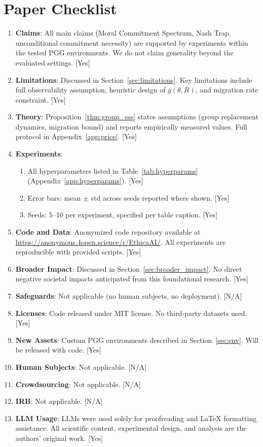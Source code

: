 \documentclass{article}
\begin{document}
\section*{Paper Checklist}

\begin{enumerate}
\item \textbf{Claims}: All main claims (Moral Commitment Spectrum, Nash Trap, unconditional commitment necessity) are supported by experiments within the tested PGG environments. We do not claim generality beyond the evaluated settings. [Yes]
\item \textbf{Limitations}: Discussed in Section~\ref{sec:limitations}. Key limitations include full observability assumption, heuristic design of $g(\theta, R)$, and migration rate constraint. [Yes]
\item \textbf{Theory}: Proposition~\ref{thm:group_ess} states assumptions (group replacement dynamics, migration bound) and reports empirically measured values. Full protocol in Appendix~\ref{app:price}. [Yes]
\item \textbf{Experiments}:
  \begin{enumerate}
    \item All hyperparameters listed in Table~\ref{tab:hyperparams} (Appendix~\ref{app:hyperparams}). [Yes]
    \item Error bars: mean $\pm$ std across seeds reported where shown. [Yes]
    \item Seeds: 5--10 per experiment, specified per table caption. [Yes]
  \end{enumerate}
\item \textbf{Code and Data}: Anonymized code repository available at \url{https://anonymous.4open.science/r/EthicaAI/}. All experiments are reproducible with provided scripts. [Yes]
\item \textbf{Broader Impact}: Discussed in Section~\ref{sec:broader_impact}. No direct negative societal impacts anticipated from this foundational research. [Yes]
\item \textbf{Safeguards}: Not applicable (no human subjects, no deployment). [N/A]
\item \textbf{Licenses}: Code released under MIT license. No third-party datasets used. [Yes]
\item \textbf{New Assets}: Custom PGG environments described in Section~\ref{sec:env}. Will be released with code. [Yes]
\item \textbf{Human Subjects}: Not applicable. [N/A]
\item \textbf{Crowdsourcing}: Not applicable. [N/A]
\item \textbf{IRB}: Not applicable. [N/A]
\item \textbf{LLM Usage}: LLMs were used solely for proofreading and LaTeX formatting assistance. All scientific content, experimental design, and analysis are the authors' original work. [Yes]
\end{enumerate}
\end{document}
